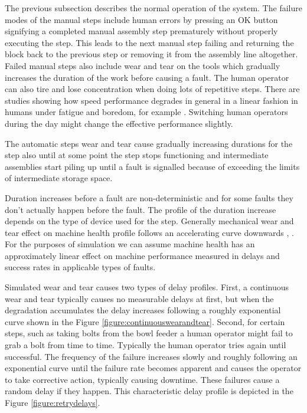 \documentclass[journal]{IEEEtran}
\begin{document}
The previous subsection describes the normal operation of the system. The failure modes of the manual steps include human errors by pressing an OK button
signifying a completed manual assembly step prematurely without properly executing the step. This leads to the next manual step failing and
returning the block back to the previous step or removing it from the assembly line altogether.
Failed manual steps also include wear and tear
on the tools which gradually increases the duration of the work before causing a fault. The human operator can also tire and lose concentration
when doing lots of repetitive steps. There are studies showing how speed performance degrades in general in a linear fashion in humans
under fatigue and boredom, for example \cite{fatigue}. Switching human operators during the day might change the effective performance slightly.

The automatic steps wear and tear cause gradually increasing durations for the step also until at some point the step stops functioning and
intermediate assemblies start piling up until a fault is signalled because of exceeding the limits of intermediate storage space.

Duration increases before a fault are non-deterministic and for some faults they don't actually happen before the fault. The profile of the duration
increase depends on the type of device used for the step. Generally mechanical wear and tear effect on machine health profile follows
an accelerating curve downwards \cite{eker2012major}, \cite{milldataset}. For the purposes of simulation we can assume machine health has an approximately
linear effect on machine performance measured in delays and success rates in applicable types of faults.

Simulated wear and tear causes two types of delay profiles. First,
a continuous wear and tear typically causes no measurable delays at first, but when the degradation accumulates the delay increases following
a roughly exponential curve shown in the Figure \ref{figure:continuouswearandtear}. Second, for certain steps, such as taking bolts from the bowl feeder a human operator
might fail to grab a bolt from time to time. Typically the human operator tries again until successful. The frequency of the failure increases
slowly and roughly following an exponential curve until the failure rate becomes apparent and causes the operator to take corrective action,
typically causing downtime. These failures cause a random delay if they happen. This characteristic delay profile is depicted in the Figure \ref{figure:retrydelays}.
\end{document}
